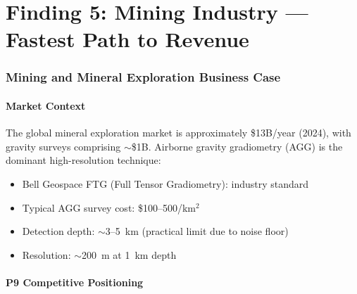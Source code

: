 \documentclass[11pt]{article}
\theoremstyle{definition}
\theoremstyle{remark}
\begin{document}
\part{Finding 5: Mining Industry --- Fastest Path to Revenue}
\label{part:mining}

\section{Mining and Mineral Exploration Business Case}
\label{sec:mining-biz}

\subsection{Market Context}

The global mineral exploration market is approximately \$13B/year (2024), with
gravity surveys comprising $\sim$\$1B. Airborne gravity gradiometry (AGG) is
the dominant high-resolution technique:

\begin{itemize}[nosep]
\item Bell Geospace FTG (Full Tensor Gradiometry): industry standard
\item Typical AGG survey cost: \$100--500/km$^2$
\item Detection depth: $\sim$3--5~km (practical limit due to noise floor)
\item Resolution: $\sim$200~m at 1~km depth
\end{itemize}

\subsection{P9 Competitive Positioning}
\end{document}
